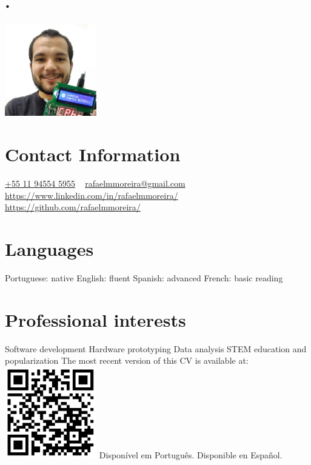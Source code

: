 \documentclass[]{cv-style}          %
\begin{document}
\lastupdated


\begin{aside}
\section{.}
\flushleft%
\includegraphics[width=4cm]{photo}
\section{Contact Information}
\href{https://wa.me/5511945545955}{+55 11 94554 5955}
~
\href{mailto:rafaelmmoreira@gmail.com}{rafaelmmoreira@gmail.com}
~
\url{https://www.linkedin.com/in/rafaelmmoreira/}
~
\url{https://github.com/rafaelmmoreira/}
%
\section{Languages}
Portuguese: native
English: fluent
Spanish: advanced
French: basic reading
%
\section{Professional interests}
Software development
Hardware prototyping
Data analysis
STEM education and popularization
%
\vspace{3.7cm}
The most recent version of this CV is available at:
\includegraphics[width=4cm]{qrcode}
Disponível em Português.
Disponible en Español.
%
\end{aside}
\end{document}
